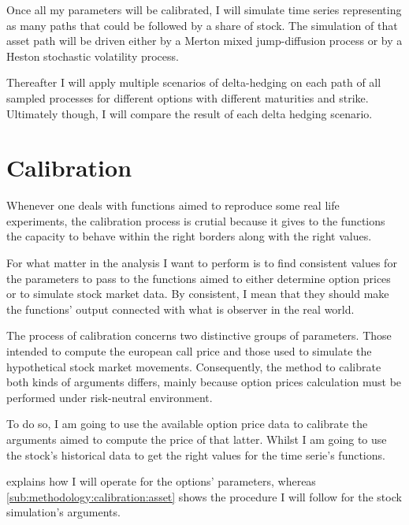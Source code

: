 \documentclass[12pt]{report}
\begin{document}
Once all my parameters will be calibrated, I will simulate time series representing as many paths that could be followed by a share of stock. The simulation of that asset path will be driven either by a Merton mixed jump-diffusion process or by a Heston stochastic volatility process.

Thereafter I will apply multiple scenarios of delta-hedging on each path of all sampled processes for different options with different maturities and strike.
Ultimately though, I will compare the result of each delta hedging scenario.






\section{Calibration}
\label{sec:methodology:calibration}

Whenever one deals with functions aimed to reproduce some real life experiments, the calibration process is crutial because it gives to the functions the capacity to behave within the right borders along with the right values.

For what matter in the analysis I want to perform is to find consistent values for the parameters to pass to the functions aimed to either determine option prices or to simulate stock market data.
By consistent, I mean that they should make the functions' output connected with what is observer in the real world.

The process of calibration concerns two distinctive groups of parameters. Those intended to compute the european call price and those used to simulate the hypothetical stock market movements.
Consequently, the method to calibrate both kinds of arguments differs, mainly because option prices calculation must be performed under risk-neutral environment.

To do so, I am going to use the available option price data to calibrate the arguments aimed to compute the price of that latter.
Whilst I am going to use the stock's historical data to get the right values for the time serie's functions.

 explains how I will operate for the options' parameters, whereas \cref{sub:methodology:calibration:asset} shows the procedure I will follow for the stock simulation's arguments.
\end{document}
